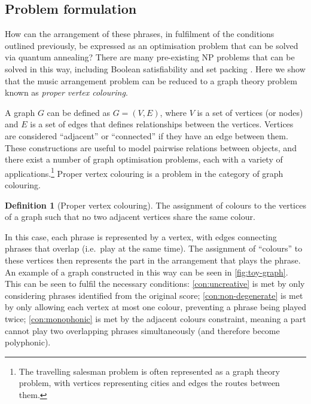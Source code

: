 \documentclass[twocolumn]{article}
\theoremstyle{definition}
\newtheorem*{definition}{Definition}
\begin{document}
\subsection{Problem formulation}

How can the arrangement of these phrases, in fulfilment of the conditions outlined previously, be expressed as an optimisation problem that can be solved via quantum annealing? There are many pre-existing NP problems that can be solved in this way, including Boolean satisfiability and set packing \cite{lucas_ising_2014}. Here we show that the music arrangement problem can be reduced to a graph theory problem known as \emph{proper vertex colouring}.

A graph $G$ can be defined as $G=(V,E)$, where $V$ is a set of vertices (or nodes) and $E$ is a set of edges that defines relationships between the vertices. Vertices are considered ``adjacent'' or ``connected'' if they have an edge between them. These constructions are useful to model pairwise relations between objects, and there exist a number of graph optimisation problems, each with a variety of applications.\footnote{The travelling salesman problem is often represented as a graph theory problem, with vertices representing cities and edges the routes between them.} Proper vertex colouring is a problem in the category of graph colouring.

\begin{definition}[Proper vertex colouring]
    The assignment of colours to the vertices of a graph such that no two adjacent vertices share the same colour.
\end{definition}

In this case, each phrase is represented by a vertex, with edges connecting phrases that overlap (i.e.\ play at the same time). The assignment of ``colours'' to these vertices then represents the part in the arrangement that plays the phrase. An example of a graph constructed in this way can be seen in \cref{fig:toy-graph}. This can be seen to fulfil the necessary conditions: \cref{con:uncreative} is met by only considering phrases identified from the original score; \cref{con:non-degenerate} is met by only allowing each vertex at most one colour, preventing a phrase being played twice; \cref{con:monophonic} is met by the adjacent colours constraint, meaning a part cannot play two overlapping phrases simultaneously (and therefore become polyphonic). 
\end{document}
